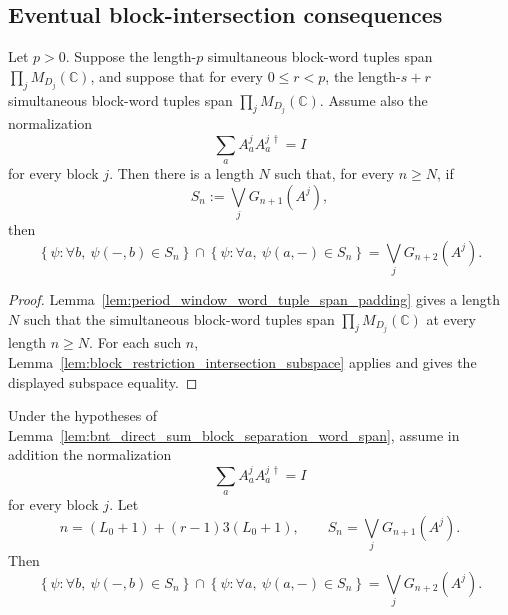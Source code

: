 \subsection{Eventual block-intersection consequences}\label{subsec:block_intersection_eventual}

\begin{lemma}
    \label{lem:period_window_block_restriction_intersection}
    \leanok
    Let \(p>0\). Suppose the length-\(p\) simultaneous block-word tuples span
    \(\prod_j M_{D_j}(\mathbb C)\), and suppose that for every \(0\le r<p\),
    the length-\(s+r\) simultaneous block-word tuples span
    \(\prod_j M_{D_j}(\mathbb C)\). Assume also the normalization
    \[
        \sum_a A^j_aA^{j\,\dagger}_a=I
    \]
    for every block \(j\). Then there is a length \(N\) such that, for every
    \(n\ge N\), if
    \[
        S_n:=\bigvee_jG_{n+1}(A^j),
    \]
    then
    \[
        \left\{\psi:\forall b,\ \psi(-,b)\in S_n\right\}
        \cap
        \left\{\psi:\forall a,\ \psi(a,-)\in S_n\right\}
        =
        \bigvee_jG_{n+2}(A^j).
    \]
\end{lemma}

\begin{proof}
    \leanok
    Lemma~\ref{lem:period_window_word_tuple_span_padding} gives a length \(N\)
    such that the simultaneous block-word tuples span
    \(\prod_j M_{D_j}(\mathbb C)\) at every length \(n\ge N\). For each such
    \(n\), Lemma~\ref{lem:block_restriction_intersection_subspace} applies and
    gives the displayed subspace equality.
\end{proof}

\begin{lemma}
    \label{lem:bnt_direct_sum_block_separation_block_intersection}
    \leanok
    Under the hypotheses of
    Lemma~\ref{lem:bnt_direct_sum_block_separation_word_span}, assume in addition the
    normalization
    \[
        \sum_a A^j_aA^{j\,\dagger}_a=I
    \]
    for every block \(j\). Let
    \[
        n=(L_0+1)+(r-1)3(L_0+1),
        \qquad
        S_n=\bigvee_jG_{n+1}(A^j).
    \]
    Then
    \[
        \left\{\psi:\forall b,\ \psi(-,b)\in S_n\right\}
        \cap
        \left\{\psi:\forall a,\ \psi(a,-)\in S_n\right\}
        =
        \bigvee_jG_{n+2}(A^j).
    \]
\end{lemma}


